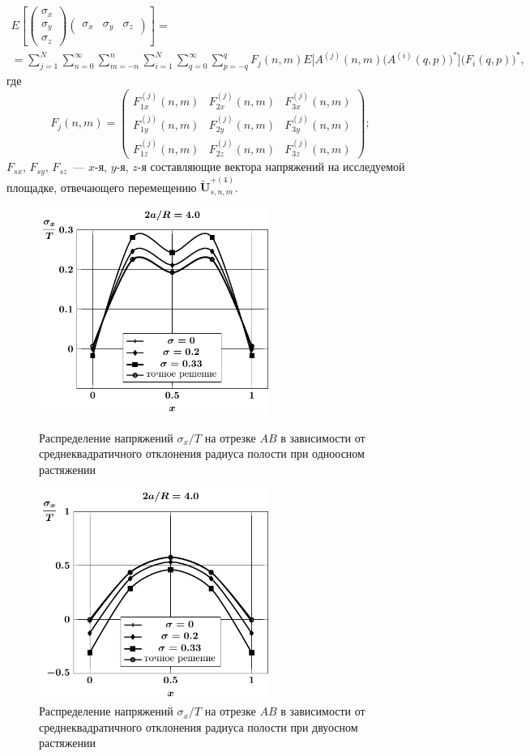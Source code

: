 \begin{multline}
E\left[
\begin{pmatrix}
\sigma_x \\
\sigma_y \\
\sigma_z 
\end{pmatrix}
\begin{pmatrix}
\sigma_x &
\sigma_y &
\sigma_z 
\end{pmatrix}
\right]= \\
=\sum_{j=1}^N\sum_{n=0}^\infty\sum_{m=-n}^n
\sum_{i=1}^N\sum_{q=0}^\infty\sum_{p=-q}^q F_j(n,m)E\Big[A^{(j)}(n,m)\Big(A^{(i)}(q,p)\Big)^*\Big]\Big(F_i(q,p)\Big)^*,
\label{eq:13:64}
\end{multline}
где 
$$
F_j(n,m)=
\begin{pmatrix}
F_{1x}^{(j)}(n,m) & F_{2x}^{(j)}(n,m) & F_{3x}^{(j)}(n,m) \\
F_{1y}^{(j)}(n,m) & F_{2y}^{(j)}(n,m) & F_{3y}^{(j)}(n,m) \\
F_{1z}^{(j)}(n,m) & F_{2z}^{(j)}(n,m) & F_{3z}^{(j)}(n,m)
\end{pmatrix};
$$
$F_{sx}$, $F_{sy}$, $F_{sz}$~--- $x$-я, $y$-я, $z$-я составляющие вектора напряжений на исследуемой площадке, отвечающего перемещению $\mathbf{\tilde U}_{s,n,m}^{+(4)}$.

\begin{figure}[h!]
\centering\footnotesize
\parbox[b]{7.5cm}{\centering\includegraphics[width=7.5cm]{spheres-cav8-t1-sig_x-stoch.pdf}
\caption{Распределение напряжений $\sigma_x/T$ на отрезке $AB$ в зависимости от среднеквадратичного отклонения радиуса полости при одноосном растяжении 
\label{f:13:2}}}\hfil\hfil
\parbox[b]{7.5cm}{\centering\includegraphics[width=7.5cm]{spheres-cav8-t2-sig_x-stoch.pdf}
\caption{Распределение напряжений $\sigma_x/T$ на отрезке $AB$ в зависимости от среднеквадратичного отклонения радиуса полости при двуосном растяжении
\label{f:13:3}}}
\end{figure}

